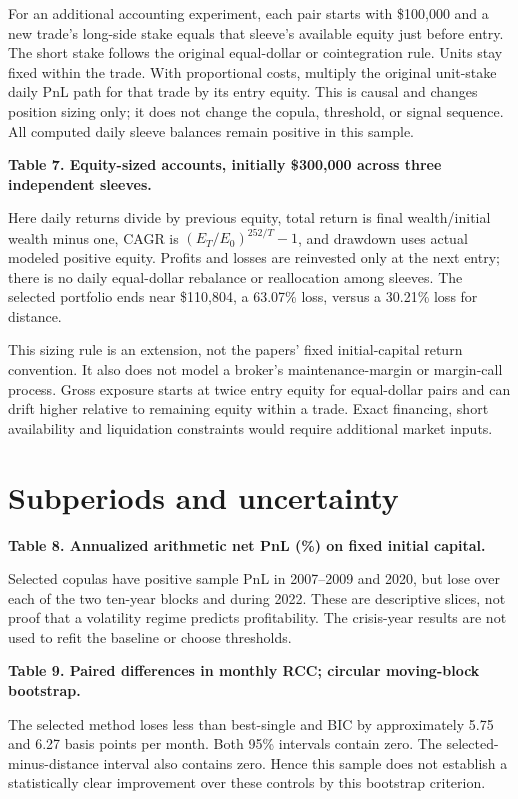 \documentclass[11pt,letterpaper]{article}
\newcommand{\resulttable}[2]{\textbf{#1}\begin{center}\small\end{center}}
\begin{document}
For an additional accounting experiment, each pair starts with \$100,000 and a new trade's long-side stake equals that sleeve's available equity just before entry. The short stake follows the original equal-dollar or cointegration rule. Units stay fixed within the trade. With proportional costs, multiply the original unit-stake daily PnL path for that trade by its entry equity. This is causal and changes position sizing only; it does not change the copula, threshold, or signal sequence. All computed daily sleeve balances remain positive in this sample.

\resulttable{Table 7. Equity-sized accounts, initially \$300,000 across three independent sleeves.}{funding}
Here daily returns divide by previous equity, total return is final wealth/initial wealth minus one, CAGR is $(E_T/E_0)^{252/T}-1$, and drawdown uses actual modeled positive equity. Profits and losses are reinvested only at the next entry; there is no daily equal-dollar rebalance or reallocation among sleeves. The selected portfolio ends near \$110,804, a 63.07\% loss, versus a 30.21\% loss for distance.

This sizing rule is an extension, not the papers' fixed initial-capital return convention. It also does not model a broker's maintenance-margin or margin-call process. Gross exposure starts at twice entry equity for equal-dollar pairs and can drift higher relative to remaining equity within a trade. Exact financing, short availability and liquidation constraints would require additional market inputs.

\section{Subperiods and uncertainty}
\resulttable{Table 8. Annualized arithmetic net PnL (\%) on fixed initial capital.}{periods}
Selected copulas have positive sample PnL in 2007--2009 and 2020, but lose over each of the two ten-year blocks and during 2022. These are descriptive slices, not proof that a volatility regime predicts profitability. The crisis-year results are not used to refit the baseline or choose thresholds.

\clearpage
\resulttable{Table 9. Paired differences in monthly RCC; circular moving-block bootstrap.}{bootstrap}
The selected method loses less than best-single and BIC by approximately 5.75 and 6.27 basis points per month. Both 95\% intervals contain zero. The selected-minus-distance interval also contains zero. Hence this sample does not establish a statistically clear improvement over these controls by this bootstrap criterion.
\end{document}
